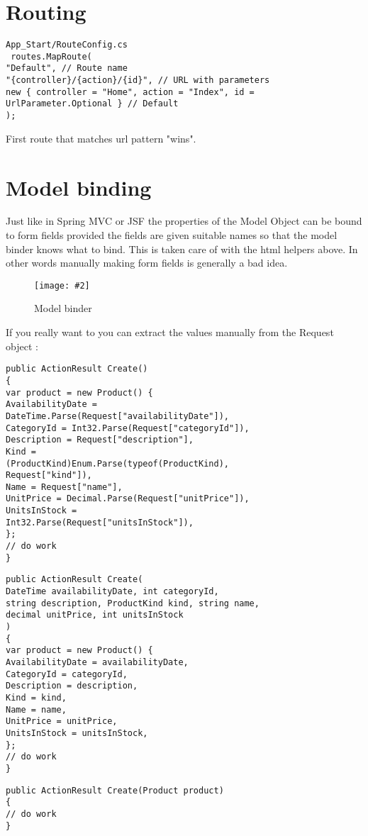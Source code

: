 \documentclass[a4paper,10pt]{scrreprt}
\newcommand{\pic}[2][figure]{\begin{figure}[h]
 \centering
 \texttt{[image: \#2]}
 \caption{#1}
\end{figure}
}
\begin{document}
\section{Routing}
\begin{lstlisting}[caption=Routing Example]
App_Start/RouteConfig.cs
 routes.MapRoute(
"Default", // Route name
"{controller}/{action}/{id}", // URL with parameters
new { controller = "Home", action = "Index", id = UrlParameter.Optional } // Default
);
\end{lstlisting}
First route that matches url pattern "wins".

\section{Model binding}
Just like in Spring MVC or JSF the properties of the Model Object can be bound to form fields provided the fields are 
given suitable names so that the model binder knows what to bind. This is taken care of with the html helpers above. In 
other words manually making form fields is generally a bad idea.

\pic[Model binder]{mbinder.png}

If you really want to you can extract the values manually from the Request object :
\begin{lstlisting}[caption=Manual reading of form values (not recommended but just in case)]
 public ActionResult Create()
{
var product = new Product() {
AvailabilityDate =
DateTime.Parse(Request["availabilityDate"]),
CategoryId = Int32.Parse(Request["categoryId"]),
Description = Request["description"],
Kind =
(ProductKind)Enum.Parse(typeof(ProductKind),
Request["kind"]),
Name = Request["name"],
UnitPrice = Decimal.Parse(Request["unitPrice"]),
UnitsInStock =
Int32.Parse(Request["unitsInStock"]),
};
// do work
}
\end{lstlisting}

\begin{lstlisting}[caption=Model binding with primitive values]
 public ActionResult Create(
DateTime availabilityDate, int categoryId,
string description, ProductKind kind, string name,
decimal unitPrice, int unitsInStock
)
{
var product = new Product() {
AvailabilityDate = availabilityDate,
CategoryId = categoryId,
Description = description,
Kind = kind,
Name = name,
UnitPrice = unitPrice,
UnitsInStock = unitsInStock,
};
// do work
}
\end{lstlisting}

\begin{lstlisting}[caption=Model binding sensibly]
 public ActionResult Create(Product product)
{
// do work
}
\end{lstlisting}
\end{document}
